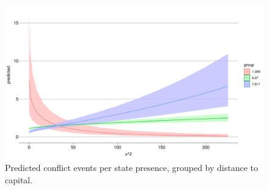 \documentclass[12pt]{article}
\begin{document}
\begin{figure}[htpb]
	\centering
	\includegraphics[width=\linewidth]{"../R/Output/ggStatePlot.pdf"}
	\caption{Predicted conflict events per state presence, grouped by
	distance to capital.}
	\label{state_int}
\end{figure}
\end{document}
